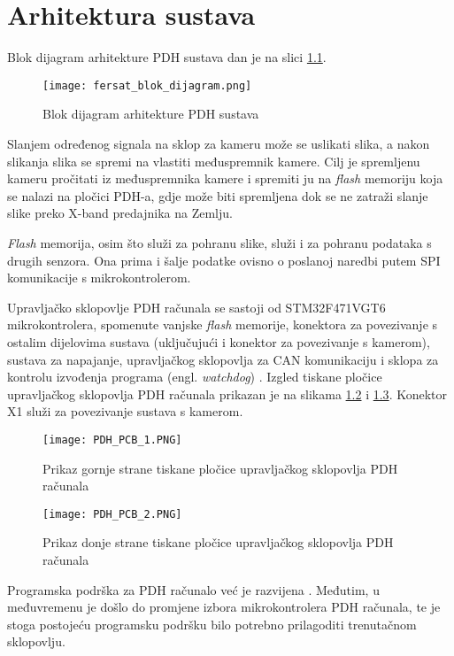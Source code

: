 \chapter{Arhitektura sustava}

Blok dijagram arhitekture PDH sustava dan je na slici \ref{fig:fersat_blok}.

\begin{figure}[H]
	\centering
	\texttt{[image: fersat\_blok\_dijagram.png]}
	\caption{Blok dijagram arhitekture PDH sustava}
	\label{fig:fersat_blok}
\end{figure}

Slanjem određenog signala na sklop za kameru može se uslikati slika, a nakon slikanja slika se spremi na vlastiti međuspremnik kamere. Cilj je spremljenu kameru pročitati iz međuspremnika kamere i spremiti ju na \textit{flash} memoriju koja se nalazi na pločici PDH-a, gdje može biti spremljena dok se ne zatraži slanje slike preko X-band predajnika na Zemlju.

\textit{Flash} memorija, osim što služi za pohranu slike, služi i za pohranu podataka s drugih senzora. Ona prima i šalje podatke ovisno o poslanoj naredbi putem SPI komunikacije s mikrokontrolerom.

Upravljačko sklopovlje PDH računala se sastoji od STM32F471VGT6 mikrokontrolera, spomenute vanjske \textit{flash} memorije, konektora za povezivanje s ostalim dijelovima sustava (uključujući i konektor za povezivanje s kamerom), sustava za napajanje, upravljačkog sklopovlja za CAN komunikaciju i sklopa za kontrolu izvođenja programa (engl. \textit{watchdog}) \cite{zavrsni_filip_juric}. Izgled tiskane pločice upravljačkog sklopovlja PDH računala prikazan je na slikama \ref{fig:PDH_PCB_1} i \ref{fig:PDH_PCB_2}. Konektor X1 služi za povezivanje sustava s kamerom.

\begin{figure}[H]
	\centering
	\texttt{[image: PDH\_PCB\_1.PNG]}
	\caption{Prikaz gornje strane tiskane pločice upravljačkog sklopovlja PDH računala \cite{zavrsni_filip_juric}}
	\label{fig:PDH_PCB_1}
\end{figure}

\begin{figure}[H]
	\centering
	\texttt{[image: PDH\_PCB\_2.PNG]}
	\caption{Prikaz donje strane tiskane pločice upravljačkog sklopovlja PDH računala \cite{zavrsni_filip_juric}}
	\label{fig:PDH_PCB_2}
\end{figure}

Programska podrška za PDH računalo već je razvijena \cite{diplomski_goran_petrak}. Međutim, u međuvremenu je došlo do promjene izbora mikrokontrolera PDH računala, te je stoga postojeću programsku podršku bilo potrebno prilagoditi trenutačnom sklopovlju.